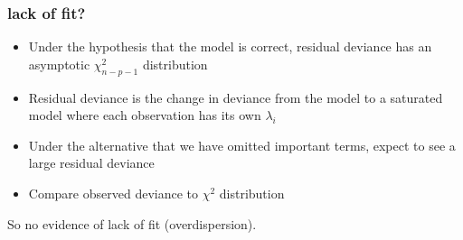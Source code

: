 \documentclass[handout]{beamer}\usepackage[]{graphicx}\usepackage[]{color}
\makeatletter
\newcommand{\hlnum}[1]{\textcolor[rgb]{0.686,0.059,0.569}{#1}}%
\newcommand{\hlopt}[1]{\textcolor[rgb]{0,0,0}{#1}}%
\newcommand{\hlstd}[1]{\textcolor[rgb]{0.345,0.345,0.345}{#1}}%
\newcommand{\hlkwd}[1]{\textcolor[rgb]{0.737,0.353,0.396}{\textbf{#1}}}%
\newenvironment{kframe}{%
 \def\at@end@of@kframe{}%
 \ifinner\ifhmode%
  \def\at@end@of@kframe{\end{minipage}}%
  \begin{minipage}{\columnwidth}%
 \fi\fi%
 \def\FrameCommand##1{\hskip\@totalleftmargin \hskip-\fboxsep
 \colorbox{shadecolor}{##1}\hskip-\fboxsep
     \hskip-\linewidth \hskip-\@totalleftmargin \hskip\columnwidth}%
 \MakeFramed {\advance\hsize-\width
   \@totalleftmargin\z@ \linewidth\hsize
   \@setminipage}}%
 {\par\unskip\endMakeFramed%
 \at@end@of@kframe}
\newenvironment{knitrout}{}{} %
\makeatother
\begin{document}
\begin{frame}[fragile]\frametitle{lack of fit?}

 \begin{itemize}
    \item Under the hypothesis that the model is correct,
    residual deviance   has an asymptotic  $\chi^2_{n - p -1}$ distribution  \pause
    \item Residual deviance is the change in deviance from the model to a saturated model where each observation has its own $\lambda_i$
\item Under the alternative that we have omitted important terms,
  expect to see a large residual deviance
 \pause
\item Compare observed deviance to $\chi^2$ distribution
\end{itemize}
So no evidence of lack of fit (overdispersion).
\end{frame}
\end{document}
